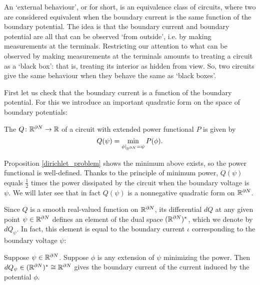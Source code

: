 An `external behaviour', or  for short, is an equivalence class of circuits, where two are considered equivalent when the boundary current is the same function of the boundary potential. The idea is that the boundary current and boundary potential are all that can be observed `from outside', i.e. by making measurements at the terminals.  Restricting our attention to what can be observed by making measurements at the terminals amounts to treating a circuit as a `black box': that is, treating its interior as hidden from view.  So, two circuits give the same behaviour when they behave the same as `black boxes'.

First let us check that the boundary current is a function of the boundary potential.  For this we introduce an important quadratic form on the space of boundary potentials:

\begin{definition}
The  $Q {\colon} {\mathbb{R}}^{\partial N} \to {\mathbb{R}}$ of a circuit with extended power functional $P$ is given by
\[
 Q(\psi) = \min_{\phi|_{{\mathbb{R}}^{\partial N}} = \psi } P(\phi).
\]
\end{definition}

Proposition \ref{dirichlet_problem} shows the minimum above exists, so the power functional is well-defined.  Thanks to the principle of minimum power, $Q(\psi)$ equals $\frac{1}{2}$ times the power dissipated by the circuit when the boundary voltage is $\psi$.  We will later see that in fact $Q(\psi)$ is a nonnegative quadratic form on ${\mathbb{R}}^{\partial N}$. 

Since $Q$ is a smooth real-valued function on ${\mathbb{R}}^{\partial N}$, its differential $d Q$ at any given point $\psi \in {\mathbb{R}}^{\partial N}$ defines an element of the dual space $({\mathbb{R}}^{\partial N})^\ast$, which we denote by $d Q_\psi$.  In fact, this element is equal to the boundary current $\iota$ corresponding to the boundary voltage $\psi$:

\begin{proposition} \label{boundary_current_determines_boundary_voltage}
Suppose $\psi \in {\mathbb{R}}^{\partial N}$.  Suppose $\phi$ is any extension of $\psi$ minimizing the power. Then $dQ_\psi \in ({\mathbb{R}}^{\partial N})^\ast \cong {\mathbb{R}}^{\partial N}$ gives the boundary current of the current induced by the potential $\phi$.
\end{proposition}

